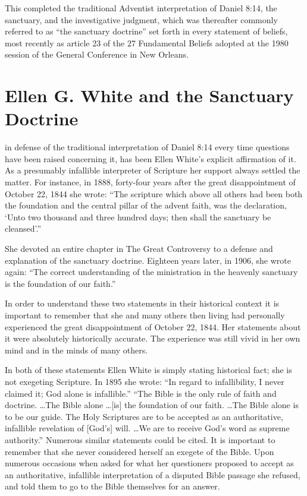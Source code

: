 This completed the traditional Adventist interpretation of Daniel 8:14, the
sanctuary, and the investigative judgment, which was thereafter commonly
referred to as ``the sanctuary doctrine'' set forth in every statement of
beliefs, most recently as article 23 of the 27 Fundamental Beliefs adopted
at the 1980 session of the General Conference in New Orleans.

\chapter{Ellen G. White and the Sanctuary Doctrine}
\label{ch:egw}

 in defense of the traditional interpretation of Daniel
8:14 every time questions have been raised concerning it, has been Ellen
White's explicit affirmation of it. As a presumably infallible interpreter
of Scripture her support always settled the matter. For instance, in 1888,
forty-four years after the great disappointment of October 22, 1844 she
wrote: ``The scripture which above all others had been both the foundation
and the central pillar of the advent faith, was the declaration, `Unto two
thousand and three hundred days; then shall the sanctuary be cleansed'.''\cite{8}

She devoted an entire chapter in The Great Controversy to a defense and
explanation of the sanctuary doctrine.\cite{9}
 Eighteen years later, in 1906, she
 wrote again: ``The correct understanding of the ministration in the heavenly
 sanctuary is the foundation of our faith.''\cite{10}

In order to understand these two statements in their historical context it
is important to remember that she and many others then living had personally
experienced the great disappointment of October 22, 1844. Her statements
about it were absolutely historically accurate. The experience was still
vivid in her own mind and in the minds of many others. 

\newpage
In both of these statements Ellen White is simply stating historical fact;
she is not exegeting Scripture. In 1895 she wrote: ``In regard to
infallibility, I never claimed it; God alone is infallible.''\cite{11} ``The Bible is
the only rule of faith and doctrine. \ldots The Bible alone \ldots [is] the
foundation of our faith. \ldots The Bible alone is to be our guide. The Holy
Scriptures are to be accepted as an authoritative, infallible revelation of
[God's] will. \ldots We are to receive God's word as supreme authority.''
\cite{12, 12a, 12b, 12c, 12d, 12e, 12f, 12g}
Numerous similar statements could be cited.\cite{13a, 13b} It is important to remember
that she never considered herself an exegete of the Bible. Upon numerous
occasions when asked for what her questioners proposed to accept as an
authoritative, infallible interpretation of a disputed Bible passage she
refused, and told them to go to the Bible themselves for an answer. 

